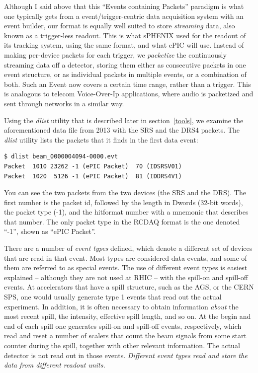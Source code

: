 \documentclass{article}[11pt]
\begin{document}
Although I said above that this ``Events containing Packets'' paradigm
is what one typically gets from a event/trigger-centric data
acquisition system with an event builder, our format is equally well
suited to store \emph{streaming} data, also known as a trigger-less
readout. This is what sPHENIX used for the readout of its tracking
system, using the same format, and what ePIC will use. Instead of making per-device packets
for each trigger, we \emph{packetize} the continuously streaming data
off a detector, storing them either as consecutive packets in one
event structure, or as individual packets in multiple events, or a
combination of both. Such an Event now covers a certain time range,
rather than a trigger. This is analogous to telecom Voice-Over-Ip
applications, where audio is packetized and sent through networks in a
similar way.




Using the \emph{dlist} utility that is described later in
section~\ref{tools}, we examine the aforementioned data file from 2013
with the SRS and the DRS4 packets. The \emph{dlist} utility lists the packets
that it finds in the first data event:

\begin{verbatim}
$ dlist beam_0000004094-0000.evt
Packet  1010 23262 -1 (ePIC Packet)  70 (IDSRSV01)
Packet  1020  5126 -1 (ePIC Packet)  81 (IDDRS4V1)
\end{verbatim}

You can see the two packets from the two devices (the SRS and the
DRS). The first number is the packet id, followed by the length in
Dwords (32-bit words), the packet type (-1), and the hitformat number
with a mnemonic that describes that number. The only packet type in
the RCDAQ format is the one denoted ``-1'', shown as ``ePIC Packet''.


There are a number of \emph{event types} defined, which denote a
different set of devices that are read in that event. Most types are
considered data events, and some of them are referred to as special
events. The use of different event types is easiest explained --
although they are not used at RHIC -- with the spill-on and spill-off
events. At accelerators that have a spill structure, such as the AGS,
or the CERN SPS, one would usually generate type 1 events that read
out the actual experiment. In addition, it is often necessary to
obtain information \emph{about} the most recent spill, the intensity,
effective spill length, and so on. At the begin and end of each spill
one generates spill-on and spill-off events, respectively, which read
and reset a number of scalers that count the beam signals from some
start counter during the spill, together with other relevant
information. The actual detector is not read out in those
events. \emph{Different event types read and store the data from
  different readout units.}
\end{document}
